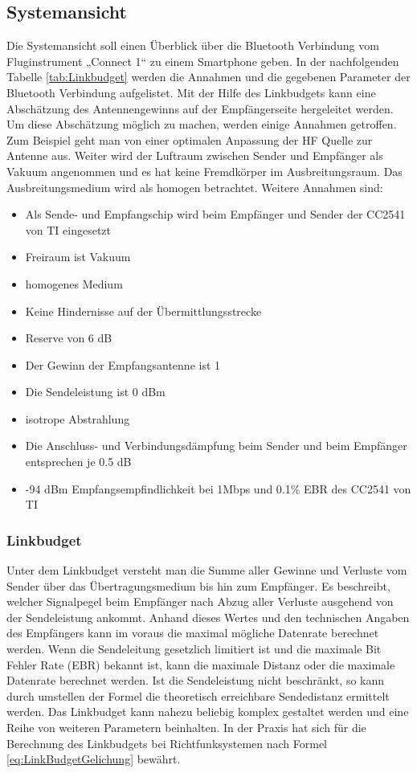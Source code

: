 \subsection{Systemansicht}
Die Systemansicht soll einen Überblick über die Bluetooth Verbindung vom Fluginstrument „Connect 1“ zu einem Smartphone geben.
In der nachfolgenden Tabelle \ref{tab:Linkbudget} werden die Annahmen und  die gegebenen Parameter der Bluetooth Verbindung aufgelistet. Mit der Hilfe des Linkbudgets kann eine Abschätzung des Antennengewinns auf der Empfängerseite hergeleitet werden. Um diese Abschätzung möglich zu machen, werden einige Annahmen getroffen. Zum Beispiel geht man von einer optimalen Anpassung der HF Quelle zur Antenne aus. Weiter wird der Luftraum zwischen Sender und Empfänger als Vakuum angenommen und es hat keine Fremdkörper im Ausbreitungsraum. Das Ausbreitungsmedium wird als homogen betrachtet.
Weitere Annahmen sind:
\begin{itemize}
\item Als Sende- und Empfangschip wird beim Empfänger und Sender der CC2541 von TI eingesetzt
\item Freiraum ist Vakuum
\item homogenes Medium
\item Keine Hindernisse auf der Übermittlungsstrecke
\item Reserve von 6 dB

\item Der Gewinn der Empfangsantenne ist 1
\item Die Sendeleistung ist 0 dBm
\item isotrope Abstrahlung
\item Die Anschluss- und Verbindungsdämpfung beim Sender und beim Empfänger entsprechen je 0.5 dB
\item -94 dBm Empfangsempfindlichkeit bei 1Mbps und 0.1\% EBR des CC2541 von TI
\end{itemize}


\subsubsection{Linkbudget}
Unter dem Linkbudget versteht man die Summe aller Gewinne und Verluste vom Sender über das Übertragungsmedium bis hin zum Empfänger. Es beschreibt, welcher Signalpegel beim Empfänger nach Abzug aller Verluste ausgehend von der Sendeleistung ankommt. Anhand dieses Wertes und den technischen Angaben des Empfängers kann im voraus die maximal mögliche Datenrate berechnet werden. Wenn die Sendeleitung gesetzlich limitiert ist und die maximale Bit Fehler Rate (EBR) bekannt ist, kann die maximale Distanz oder die maximale Datenrate berechnet werden. Ist die Sendeleistung nicht beschränkt, so kann durch umstellen der Formel die theoretisch erreichbare Sendedistanz ermittelt werden. 
Das Linkbudget kann  nahezu beliebig komplex gestaltet werden und eine  Reihe von weiteren Parametern beinhalten. In der Praxis hat sich für die Berechnung des Linkbudgets bei Richtfunksystemen nach  Formel \ref{eq:LinkBudgetGelichung} bewährt.


